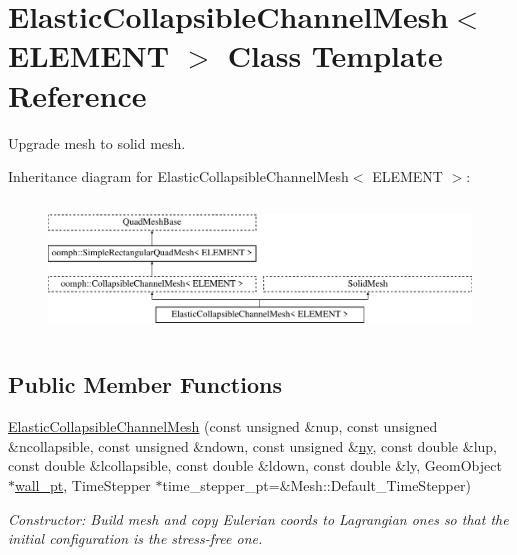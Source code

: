 \hypertarget{classElasticCollapsibleChannelMesh}{}\section{Elastic\+Collapsible\+Channel\+Mesh$<$ E\+L\+E\+M\+E\+NT $>$ Class Template Reference}
\label{classElasticCollapsibleChannelMesh}


Upgrade mesh to solid mesh.  


Inheritance diagram for Elastic\+Collapsible\+Channel\+Mesh$<$ E\+L\+E\+M\+E\+NT $>$\+:\begin{figure}[H]
\begin{center}
\leavevmode
\includegraphics[height=3.589744cm]{classElasticCollapsibleChannelMesh}
\end{center}
\end{figure}
\subsection*{Public Member Functions}
\begin{DoxyCompactItemize}
\item 
\hyperlink{classElasticCollapsibleChannelMesh_aa8a158f7f3d3e40dc29bdaa756546771}{Elastic\+Collapsible\+Channel\+Mesh} (const unsigned \&nup, const unsigned \&ncollapsible, const unsigned \&ndown, const unsigned \&\hyperlink{classoomph_1_1SimpleRectangularQuadMesh_a45011f22dedd480392b1f376e4269921}{ny}, const double \&lup, const double \&lcollapsible, const double \&ldown, const double \&ly, Geom\+Object $\ast$\hyperlink{classoomph_1_1CollapsibleChannelMesh_a04ffeb61678763dfd250962ea9ba614b}{wall\+\_\+pt}, Time\+Stepper $\ast$time\+\_\+stepper\+\_\+pt=\&Mesh\+::\+Default\+\_\+\+Time\+Stepper)
\begin{DoxyCompactList}\small\item\em Constructor\+: Build mesh and copy Eulerian coords to Lagrangian ones so that the initial configuration is the stress-\/free one. \end{DoxyCompactList}\end{DoxyCompactItemize}
